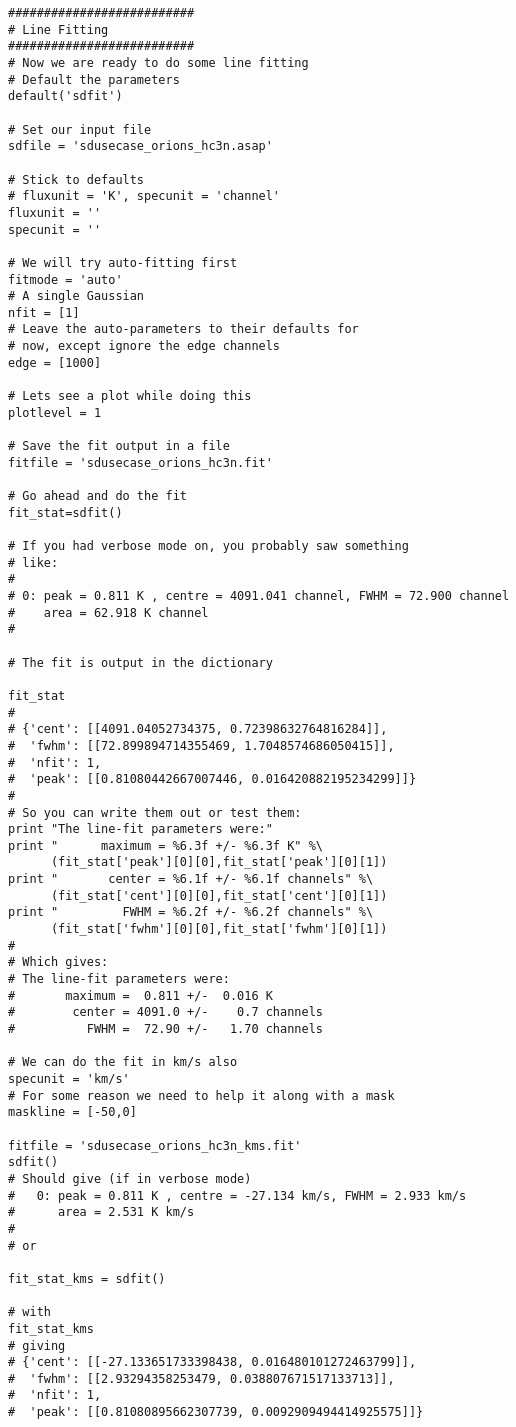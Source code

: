 \begin{verbatim}
##########################
# Line Fitting
##########################
# Now we are ready to do some line fitting
# Default the parameters
default('sdfit')

# Set our input file
sdfile = 'sdusecase_orions_hc3n.asap'

# Stick to defaults
# fluxunit = 'K', specunit = 'channel'
fluxunit = ''
specunit = ''

# We will try auto-fitting first
fitmode = 'auto'
# A single Gaussian
nfit = [1]
# Leave the auto-parameters to their defaults for
# now, except ignore the edge channels
edge = [1000]

# Lets see a plot while doing this
plotlevel = 1

# Save the fit output in a file
fitfile = 'sdusecase_orions_hc3n.fit'

# Go ahead and do the fit
fit_stat=sdfit()

# If you had verbose mode on, you probably saw something
# like:
#
# 0: peak = 0.811 K , centre = 4091.041 channel, FWHM = 72.900 channel
#    area = 62.918 K channel
#

# The fit is output in the dictionary

fit_stat
#
# {'cent': [[4091.04052734375, 0.72398632764816284]],
#  'fwhm': [[72.899894714355469, 1.7048574686050415]],
#  'nfit': 1,
#  'peak': [[0.81080442667007446, 0.016420882195234299]]}
#
# So you can write them out or test them:
print "The line-fit parameters were:"
print "      maximum = %6.3f +/- %6.3f K" %\
      (fit_stat['peak'][0][0],fit_stat['peak'][0][1])
print "       center = %6.1f +/- %6.1f channels" %\
      (fit_stat['cent'][0][0],fit_stat['cent'][0][1])
print "         FWHM = %6.2f +/- %6.2f channels" %\
      (fit_stat['fwhm'][0][0],fit_stat['fwhm'][0][1])
#
# Which gives:
# The line-fit parameters were:
#       maximum =  0.811 +/-  0.016 K
#        center = 4091.0 +/-    0.7 channels
#          FWHM =  72.90 +/-   1.70 channels

# We can do the fit in km/s also
specunit = 'km/s'
# For some reason we need to help it along with a mask
maskline = [-50,0]

fitfile = 'sdusecase_orions_hc3n_kms.fit'
sdfit()
# Should give (if in verbose mode)
#   0: peak = 0.811 K , centre = -27.134 km/s, FWHM = 2.933 km/s
#      area = 2.531 K km/s
#
# or

fit_stat_kms = sdfit()

# with
fit_stat_kms
# giving
# {'cent': [[-27.133651733398438, 0.016480101272463799]],
#  'fwhm': [[2.93294358253479, 0.038807671517133713]],
#  'nfit': 1,
#  'peak': [[0.81080895662307739, 0.0092909494414925575]]}



\end{verbatim}
